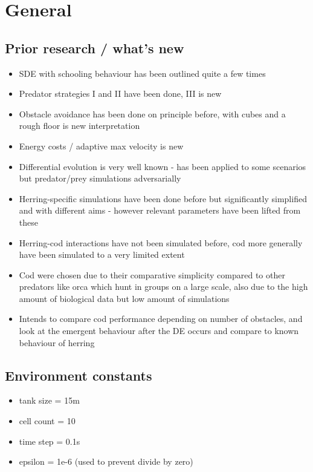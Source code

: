 \section{General}
\subsection{Prior research / what's new}
\begin{itemize}
    \item SDE with schooling behaviour has been outlined quite a few times
    \item Predator strategies I and II have been done, III is new
    \item Obstacle avoidance has been done on principle before, with cubes and a rough floor is new interpretation
    \item Energy costs / adaptive max velocity is new
    \item Differential evolution is very well known - has been applied to some scenarios but predator/prey simulations adversarially
    \item Herring-specific simulations have been done before but significantly simplified and with different aims - however relevant parameters have been lifted from these
    \item Herring-cod interactions have not been simulated before, cod more generally have been simulated to a very limited extent
    \item Cod were chosen due to their comparative simplicity compared to other predators like orca which hunt in groups on a large scale, also due to the high amount of biological data but low amount of simulations
    \item Intends to compare cod performance depending on number of obstacles, and look at the emergent behaviour after the DE occurs and compare to known behaviour of herring
\end{itemize}
\subsection{Environment constants}
\begin{itemize}
    \item tank size = 15m
    \item cell count = 10
    \item time step = 0.1s
    \item epsilon = 1e-6 (used to prevent divide by zero)
\end{itemize}
